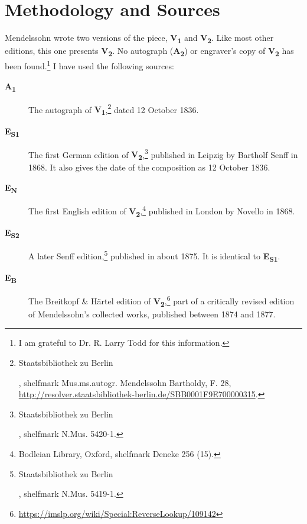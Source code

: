 \documentclass[a4paper, 12pt]{book}
\newcommand{\source}[2]{\textbf{#1\textsubscript{#2}}}
\begin{document}
\ifdef{\critical}
  {%
    \section*{Methodology and Sources}

    Mendelssohn wrote two versions of the piece, \source{V}{1} and
    \source{V}{2}. Like most other editions, this one presents
    \source{V}{2}. No autograph (\source{A}{2}) or engraver's copy of
    \source{V}{2} has been found.\footnote{I am grateful to
      Dr. R. Larry Todd for this information.} I have used the
    following sources:
    
    \begin{description}
    \item[\source{A}{1}] The autograph of
      \source{V}{1},\footnote{\begin{otherlanguage}{ngerman}Staatsbibliothek
          zu Berlin\end{otherlanguage}, shelfmark
          Mus.ms.autogr. Mendelssohn Bartholdy, F. 28,
          \url{http://resolver.staatsbibliothek-berlin.de/SBB0001F9E700000315}.}
      dated 12 October 1836.
    \item[\source{E}{S1}] The first German edition of
      \source{V}{2},\footnote{\begin{otherlanguage}{ngerman}Staatsbibliothek
          zu Berlin\end{otherlanguage}, shelfmark N.Mus. 5420-1.}
      published in Leipzig by Bartholf Senff in 1868. It also gives
      the date of the composition as 12 October 1836.
    \item[\source{E}{N}] The first English edition of
      \source{V}{2},\footnote{Bodleian Library, Oxford, shelfmark Deneke 256 (15).} published in London by Novello
      in 1868.
    \item[\source{E}{S2}] A later Senff
      edition,\footnote{\begin{otherlanguage}{ngerman}Staatsbibliothek
          zu Berlin\end{otherlanguage}, shelfmark N.Mus. 5419-1.}
      published in about 1875. It is identical to \source{E}{S1}.
    \item[\source{E}{B}] The Breitkopf \& Härtel edition of
      \source{V}{2},\footnote{\url{https://imslp.org/wiki/Special:ReverseLookup/109142}}
      part of a critically revised edition of Mendelssohn's collected
      works, published between 1874 and 1877.
    \end{description}

}
\end{document}
